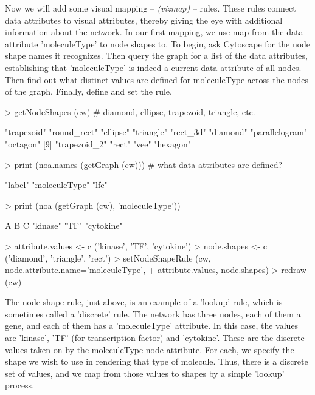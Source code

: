 \documentclass[12pt]{article}
\begin{document}
Now we will add some visual mapping -- \emph {(vizmap)} -- rules.  These rules connect data attributes to visual attributes, thereby giving the eye with additional information about the network.  In our first mapping, we use map from the data attribute 'moleculeType' to node shapes to.  To begin, ask Cytoscape for the node shape names it recognizes.  Then query the graph for a list of the data attributes, establishing that 'moleculeType' is indeed a current data attribute of all nodes.  Then find out what distinct values are defined for moleculeType across the nodes of the graph.  Finally, define and set the rule.

\begin{Schunk}
\begin{Sinput}
>   getNodeShapes (cw)   # diamond, ellipse, trapezoid, triangle, etc.
\end{Sinput}
\begin{Soutput}
 [1] "trapezoid"     "round_rect"    "ellipse"       "triangle"      "rect_3d"       "diamond"       "parallelogram" "octagon"      
 [9] "trapezoid_2"   "rect"          "vee"           "hexagon"      
\end{Soutput}
\begin{Sinput}
>   print (noa.names (getGraph (cw)))  # what data attributes are defined?
\end{Sinput}
\begin{Soutput}
[1] "label"        "moleculeType" "lfc"         
\end{Soutput}
\begin{Sinput}
>   print (noa (getGraph (cw), 'moleculeType'))
\end{Sinput}
\begin{Soutput}
         A          B          C 
  "kinase"       "TF" "cytokine" 
\end{Soutput}
\begin{Sinput}
>   attribute.values <- c ('kinase',  'TF',       'cytokine')
>   node.shapes      <- c ('diamond', 'triangle', 'rect')
>   setNodeShapeRule (cw, node.attribute.name='moleculeType',
+                     attribute.values, node.shapes)
>   redraw (cw)
\end{Sinput}
\end{Schunk}

The node shape rule, just above, is an example of a 'lookup' rule, which is sometimes called a 'discrete' rule.  The
network has three nodes, each of them a gene, and each of them has a 'moleculeType' attribute.  In this case, the values
are 'kinase', 'TF' (for transcription factor) and 'cytokine'.  These are the discrete values taken on by the
moleculeType node attribute.  For each, we specify the shape we wish to use in rendering that type of molecule.  Thus, there
is a discrete set of values, and we map from those values to shapes by a simple 'lookup' process.
\end{document}
